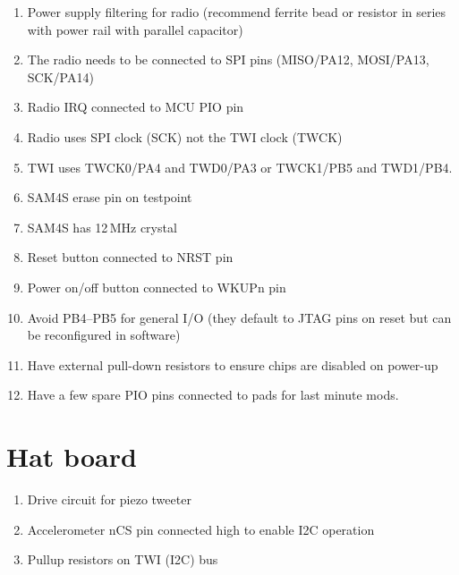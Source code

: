 \documentclass[a4paper, 12pt]{article}
\begin{document}
\begin{enumerate}
\item Power supply filtering for radio (recommend ferrite bead or
  resistor in series with power rail with parallel capacitor)

\item The radio needs to be connected to SPI pins (MISO/PA12,
  MOSI/PA13, SCK/PA14)

\item Radio IRQ connected to MCU PIO pin

\item Radio uses SPI clock (SCK) not the TWI clock (TWCK)

\item TWI uses TWCK0/PA4 and TWD0/PA3 or TWCK1/PB5 and TWD1/PB4.

\item SAM4S erase pin on testpoint

\item SAM4S has 12\,MHz crystal

\item Reset button connected to NRST pin

\item Power on/off button connected to WKUPn pin

\item Avoid PB4--PB5 for general I/O (they default to JTAG pins on
  reset but can be reconfigured in software)

\item Have external pull-down resistors to ensure chips are disabled on
  power-up

\item Have a few spare PIO pins connected to pads for last minute mods.

\end{enumerate}


\section{Hat board}

\begin{enumerate}


\item Drive circuit for piezo tweeter



\item Accelerometer nCS pin connected high to enable I2C operation

\item Pullup resistors on TWI (I2C) bus

\end{enumerate}
\end{document}
